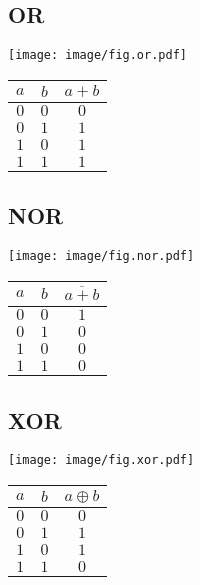\columnbreak

\subsection*{OR}
\begin{minipage}[t][2em][c]{\linewidth}
	\centering
	\texttt{[image: image/fig.or.pdf]}
\end{minipage}
\begin{center}
	\begin{tabular}{cc|c}
		\toprule
		$a$ & $b$ & $a+b$ \\
		\midrule
		$0$ & $0$ & $0$   \\
		$0$ & $1$ & $1$   \\
		$1$ & $0$ & $1$   \\
		$1$ & $1$ & $1$   \\
		\bottomrule
	\end{tabular}
\end{center}

\subsection*{NOR}
\begin{minipage}[t][2em][c]{\linewidth}
	\centering
	\texttt{[image: image/fig.nor.pdf]}
\end{minipage}
\begin{center}
	\begin{tabular}{cc|c}
		\toprule
		$a$ & $b$ & $\overline{a+b}$ \\
		\midrule
		$0$ & $0$ & $1$              \\
		$0$ & $1$ & $0$              \\
		$1$ & $0$ & $0$              \\
		$1$ & $1$ & $0$              \\
		\bottomrule
	\end{tabular}
\end{center}

\columnbreak

\subsection*{XOR}
\begin{minipage}[t][2em][c]{\linewidth}
	\centering
	\texttt{[image: image/fig.xor.pdf]}
\end{minipage}
\begin{center}
	\begin{tabular}{cc|c}
		\toprule
		$a$ & $b$ & $a \oplus b$ \\
		\midrule
		$0$ & $0$ & $0$          \\
		$0$ & $1$ & $1$          \\
		$1$ & $0$ & $1$          \\
		$1$ & $1$ & $0$          \\
		\bottomrule
	\end{tabular}
\end{center}


